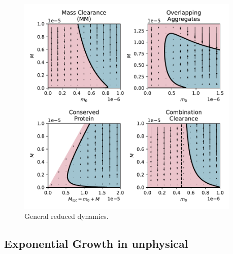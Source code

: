 \begin{figure}
    \centering
    \includegraphics[width=0.95\textwidth]{figures/generalisingReduced_nocol.pdf}
    \caption{General reduced dynamics.}
    \label{fig:4-generalReduced}
\end{figure}

\subsection{Exponential Growth in unphysical}

